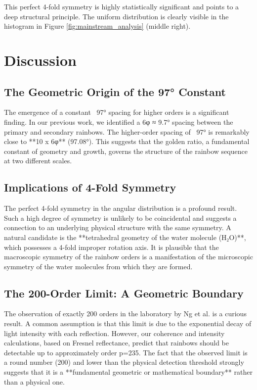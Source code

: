 \documentclass[12pt, twoside]{article}
\begin{document}
This perfect 4-fold symmetry is highly statistically significant and points to a deep structural principle. The uniform distribution is clearly visible in the histogram in Figure \ref{fig:mainstream_analysis} (middle right).

\section{Discussion}

\subsection{The Geometric Origin of the 97° Constant}
The emergence of a constant ~97° spacing for higher orders is a significant finding. In our previous work, we identified a 6φ ≈ 9.7° spacing between the primary and secondary rainbows. The higher-order spacing of ~97° is remarkably close to **10 x 6φ** (97.08°). This suggests that the golden ratio, a fundamental constant of geometry and growth, governs the structure of the rainbow sequence at two different scales.

\subsection{Implications of 4-Fold Symmetry}
The perfect 4-fold symmetry in the angular distribution is a profound result. Such a high degree of symmetry is unlikely to be coincidental and suggests a connection to an underlying physical structure with the same symmetry. A natural candidate is the **tetrahedral geometry of the water molecule (H₂O)**, which possesses a 4-fold improper rotation axis. It is plausible that the macroscopic symmetry of the rainbow orders is a manifestation of the microscopic symmetry of the water molecules from which they are formed.

\subsection{The 200-Order Limit: A Geometric Boundary}
The observation of exactly 200 orders in the laboratory by Ng et al. is a curious result. A common assumption is that this limit is due to the exponential decay of light intensity with each reflection. However, our coherence and intensity calculations, based on Fresnel reflectance, predict that rainbows should be detectable up to approximately order p=235. The fact that the observed limit is a round number (200) and lower than the physical detection threshold strongly suggests that it is a **fundamental geometric or mathematical boundary** rather than a physical one.
\end{document}
